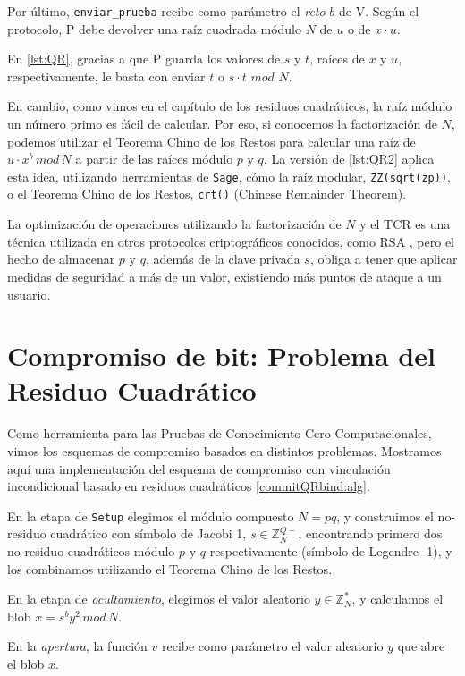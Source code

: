 Por último, \texttt{enviar\_prueba} recibe como parámetro el \textit{reto} $b$ de V. Según el protocolo, P debe devolver una raíz cuadrada módulo $N$ de $u$ o de $x\cdot u$.

En \autoref{lst:QR}, gracias a que P guarda los valores de $s$ y $t$, raíces de $x$ y $u$, respectivamente, le basta con enviar $t$ o $s\cdot t$ $mod$ $N$.

En cambio, como vimos en el capítulo de los residuos cuadráticos, la raíz módulo un número primo es fácil de calcular. Por eso, si conocemos la factorización de $N$, podemos utilizar el Teorema Chino de los Restos para calcular una raíz de $u\cdot x^b \, mod \, N$ a partir de las raíces módulo $p$ y $q$. La versión de \autoref{lst:QR2} aplica esta idea, utilizando herramientas de \texttt{Sage}, cómo la raíz modular, \texttt{ZZ(sqrt(zp))}, o el Teorema Chino de los Restos, \texttt{crt()} (Chinese Remainder Theorem).




\hfil

La optimización de operaciones utilizando la factorización de $N$ y el TCR es una técnica utilizada en otros protocolos criptográficos conocidos, como RSA \citep{book:1210287}, pero el hecho de almacenar $p$ y $q$, además de la clave privada $s$, obliga a tener que aplicar medidas de seguridad a más de un valor, existiendo más puntos de ataque a un usuario.




\section{Compromiso de bit: Problema del Residuo Cuadrático}

Como herramienta para las Pruebas de Conocimiento Cero Computacionales, vimos los esquemas de compromiso basados en distintos problemas. Mostramos aquí una implementación del esquema de compromiso con vinculación incondicional basado en residuos cuadráticos \ref{commitQRbind:alg}.




En la etapa de \texttt{Setup} elegimos el módulo compuesto $N=pq$, y construimos el no-residuo cuadrático con símbolo de Jacobi 1, $s\in \mathbb{Z}_N^{Q-}$, encontrando primero dos no-residuo cuadráticos módulo $p$ y $q$ respectivamente (símbolo de Legendre -1), y los combinamos utilizando el Teorema Chino de los Restos.

En la etapa de \textit{ocultamiento}, elegimos el valor aleatorio $y \in \mathbb{Z}_N^*$, y calculamos el blob $x=s^b y^2 \, mod \, N$.

En la \textit{apertura}, la función $v$ recibe como parámetro el valor aleatorio $y$ que abre el blob $x$.



